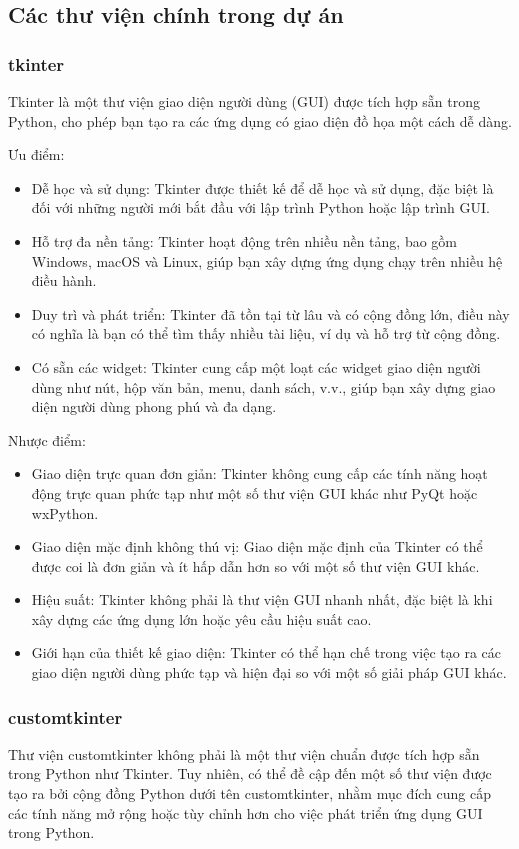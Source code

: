 \documentclass{article} %
\begin{document}
\subsection{Các thư viện chính trong dự án}
\subsubsection{tkinter} 
Tkinter là một thư viện giao diện người dùng (GUI) được tích hợp sẵn trong Python, cho phép bạn tạo ra các ứng dụng có giao diện đồ họa một cách dễ dàng.

Ưu điểm:
\begin{itemize}
    \item Dễ học và sử dụng: Tkinter được thiết kế để dễ học và sử dụng, đặc biệt là đối với những người mới bắt đầu với lập trình Python hoặc lập trình GUI.
    \item Hỗ trợ đa nền tảng: Tkinter hoạt động trên nhiều nền tảng, bao gồm Windows, macOS và Linux, giúp bạn xây dựng ứng dụng chạy trên nhiều hệ điều hành.
    \item Duy trì và phát triển: Tkinter đã tồn tại từ lâu và có cộng đồng lớn, điều này có nghĩa là bạn có thể tìm thấy nhiều tài liệu, ví dụ và hỗ trợ từ cộng đồng.
    \item Có sẵn các widget: Tkinter cung cấp một loạt các widget giao diện người dùng như nút, hộp văn bản, menu, danh sách, v.v., giúp bạn xây dựng giao diện người dùng phong phú và đa dạng.
\end{itemize}

\hspace{0.0em} Nhược điểm:

\begin{itemize}
    \item Giao diện trực quan đơn giản: Tkinter không cung cấp các tính năng hoạt động trực quan phức tạp như một số thư viện GUI khác như PyQt hoặc wxPython.
    \item Giao diện mặc định không thú vị: Giao diện mặc định của Tkinter có thể được coi là đơn giản và ít hấp dẫn hơn so với một số thư viện GUI khác.
    \item Hiệu suất: Tkinter không phải là thư viện GUI nhanh nhất, đặc biệt là khi xây dựng các ứng dụng lớn hoặc yêu cầu hiệu suất cao.
    \item Giới hạn của thiết kế giao diện: Tkinter có thể hạn chế trong việc tạo ra các giao diện người dùng phức tạp và hiện đại so với một số giải pháp GUI khác.
\end{itemize}
\subsubsection{customtkinter}
Thư viện customtkinter không phải là một thư viện chuẩn được tích hợp sẵn trong Python như Tkinter. Tuy nhiên, có thể đề cập đến một số thư viện được tạo ra bởi cộng đồng Python dưới tên customtkinter, nhằm mục đích cung cấp các tính năng mở rộng hoặc tùy chỉnh hơn cho việc phát triển ứng dụng GUI trong Python.
\end{document}
